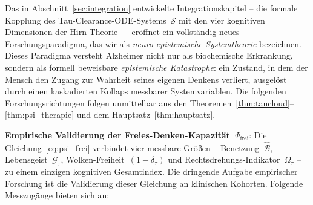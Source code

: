﻿\documentclass[12pt,a4paper]{article}
\theoremstyle{definition}
\begin{document}
	Das in Abschnitt~\ref{sec:integration} entwickelte Integrationskapitel -- die formale Kopplung des Tau-Clearance-ODE-Systems~$\mathcal{S}$ mit den vier kognitiven Dimensionen der Hirn-Theorie~\cite{Epp2026brn} -- eröffnet ein vollständig neues Forschungsparadigma, das wir als \emph{neuro-epistemische Systemtheorie} bezeichnen. Dieses Paradigma versteht Alzheimer nicht nur als biochemische Erkrankung, sondern als formell beweisbare \emph{epistemische Katastrophe}: ein Zustand, in dem der Mensch den Zugang zur Wahrheit seines eigenen Denkens verliert, ausgelöst durch einen kaskadierten Kollaps messbarer Systemvariablen. Die folgenden Forschungsrichtungen folgen unmittelbar aus den Theoremen~\ref{thm:taucloud}--\ref{thm:psi_therapie} und dem Hauptsatz~\ref{thm:hauptsatz}.

	\textbf{Empirische Validierung der Freies-Denken-Kapazität~$\Psi_{\mathrm{frei}}$}:
	Die Gleichung~\eqref{eq:psi_frei} verbindet vier messbare Größen -- Benetzung~$\hat{\mathcal{B}}$, Lebensgeist~$\mathcal{G}_\tau$, Wolken-Freiheit~$(1-\delta_\tau)$ und Rechtsdrehungs-Indikator~$\Omega_\tau$ -- zu einem einzigen kognitiven Gesamtindex. Die dringende Aufgabe empirischer Forschung ist die Validierung dieser Gleichung an klinischen Kohorten.
	Folgende Messzugänge bieten sich an:
\end{document}
